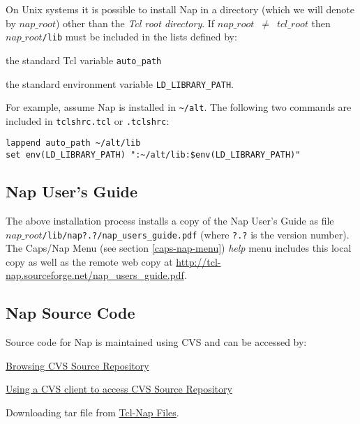  On Unix systems it is possible to install Nap in a directory
  (which we will denote by 
  $nap\_root$) other than the 
  \emph{Tcl root directory}. If 
  $nap\_root$\ $\neq$\  
  $tcl\_root$ then 
  $nap\_root$\texttt{/lib} must be included in the lists defined by:
\begin{bullets}
    \item the standard Tcl variable 
    \texttt{auto\_path}
    \item the standard environment variable 
    \texttt{LD\_LIBRARY\_PATH}.
\end{bullets}
For example, assume Nap is installed in 
  \verb!~/alt!. 
The following two commands are included in 
  \texttt{tclshrc.tcl} or 
  \texttt{.tclshrc}:
\begin{verbatim}
lappend auto_path ~/alt/lib
set env(LD_LIBRARY_PATH) ":~/alt/lib:$env(LD_LIBRARY_PATH)"
\end{verbatim}

\subsection{Nap User's Guide}
    \label{install-nap-doc}

The above installation process installs a copy of the Nap User's Guide
as file
\\
$nap\_root$\texttt{/lib/nap?.?/nap\_users\_guide.pdf}
(where \texttt{?.?} is the version number).
The Caps/Nap Menu (see section \ref{caps-nap-menu})
\emph{help} menu includes this local copy as well as the remote web copy at
\href{http://tcl-nap.sourceforge.net/nap\_users\_guide.pdf}
{http://tcl-nap.sourceforge.net/nap\_users\_guide.pdf}.

\subsection{Nap Source Code}
    \label{install-source}

Source code for Nap is maintained using CVS and can be accessed
  by:
\begin{bullets}
    \item 
      \href{http://tcl-nap.cvs.sourceforge.net/tcl-nap/}{Browsing CVS Source Repository}
    \item 
      \href{http://sourceforge.net/cvs/?group_id=55616}{Using
	a CVS client to access CVS Source Repository}
    \item Downloading tar file from 
    \href{http://sourceforge.net/project/showfiles.php?group_id=55616}{Tcl-Nap Files}.
\end{bullets}

